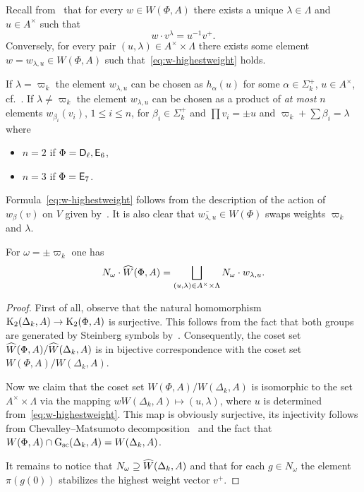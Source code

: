 Recall from~\cite[Lemma~6]{V00} that for every $w \in W(\Phi, A)$ there exists a unique $\lambda \in \Lambda$ and $u \in A^\times $ such that
 \begin{equation}\label{eq:w-highestweight} w \cdot v^\lambda = u^{-1} v^+. \end{equation}
Conversely, for every pair $(u, \lambda) \in A^\times \times \Lambda$ there exists some element $w = w_{\lambda, u} \in W(\Phi, A)$ such that~\eqref{eq:w-highestweight} holds.
\begin{rem}
    If $\lambda = \varpi_k$ the element $w_{\lambda, u}$ can be chosen as $h_\alpha(u)$ for some $\alpha \in \Sigma_k^+$, $u \in A^\times$, cf.~\cite[Lemma~7]{V00}.
    If $\lambda \neq \varpi_k$ the element $w_{\lambda, u}$ can be chosen as a product of \textit{at most} $n$ elements
     $w_{\beta_i}(v_i)$, $1 \leq i \leq n$, for $\beta_i\in\Sigma_k^+$ and $\prod v_i = \pm u$ and $\varpi_k + \sum \beta_i = \lambda$ where
    \begin{itemize}
        \item $n=2$ if $\Phi = \mathsf{D}_\ell, \mathsf{E}_6$,
        \item $n=3$ if $\Phi = \mathsf{E}_7$.
    \end{itemize}
    Formula~\eqref{eq:w-highestweight} follows from the description of the action of $w_\beta(v)$ on $V$ given by~\cite[Lemma~6]{V00}.
    It is also clear that $\overline{w_{\lambda, u}} \in W(\Phi)$ swaps weights $\varpi_k$ and $\lambda$.
\end{rem}


\begin{lemma} \label{lem:can-repr}
  For $\omega = \pm \varpi_k$ one has \[N_{\omega} \cdot \widehat{W}(\Phi, A) = \bigsqcup\limits_{(u, \lambda) \in A^\times \times \Lambda} N_{\omega} \cdot w_{\lambda, u}. \]
\end{lemma}
\begin{proof}
  First of all, observe that the natural homomorphism $\operatorname{K}_2(\Delta_k, A) \to \operatorname{K}_2(\Phi, A)$ is surjective.
  This follows from the fact that both groups are generated by Steinberg symbols by~\cite[Theorem~2.5]{Ste73}.
  Consequently, the coset set $\widehat{W}(\Phi, A) / \widehat{W}(\Delta_k, A)$ is in bijective correspondence with the coset set $W(\Phi, A)/W(\Delta_k, A)$.

  Now we claim that the coset set $W(\Phi, A)/W(\Delta_k, A)$ is isomorphic to the set $A^\times \times \Lambda$
   via the mapping $w W(\Delta_k, A) \mapsto (u, \lambda)$, where $u$ is determined from~\eqref{eq:w-highestweight}.
  This map is obviously surjective, its injectivity follows from Chevalley--Matsumoto decomposition~\cite[Theorem~1.3]{St78}
   and the fact that $W(\Phi, A) \cap \operatorname{G}_\mathrm{sc}(\Delta_k, A) = W(\Delta_k, A)$.

  It remains to notice that $N_{\omega} \supseteq \widehat{W}(\Delta_k, A)$ and that for each $g \in N_{\omega}$ the element $\pi(g(0))$ stabilizes the highest weight vector $v^+$.
\end{proof}

